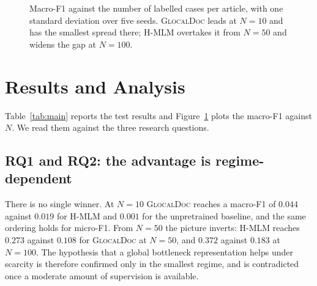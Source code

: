 \documentclass[conference]{IEEEtran}
\newcommand{\glocal}{\textsc{GlocalDoc}}
\newcommand{\hmlm}{\mbox{H-MLM}}
\begin{document}
\begin{figure}[t]
\centering
{}
\caption{Macro-F1 against the number of labelled cases per article, with one
standard deviation over five seeds. \glocal{} leads at $N=10$ and has the smallest
spread there; \hmlm{} overtakes it from $N=50$ and widens the gap at $N=100$.}
\label{fig:macro}
\end{figure}

\section{Results and Analysis}
\label{sec:results}
Table~\ref{tab:main} reports the test results and Figure~\ref{fig:macro} plots the
macro-F1 against $N$. We read them against the three research questions.

\subsection{RQ1 and RQ2: the advantage is regime-dependent}
There is no single winner. At $N=10$ \glocal{} reaches a macro-F1 of $0.044$ against
$0.019$ for \hmlm{} and $0.001$ for the unpretrained baseline, and the same ordering
holds for micro-F1. From $N=50$ the picture inverts: \hmlm{} reaches $0.273$ against
$0.108$ for \glocal{} at $N=50$, and $0.372$ against $0.183$ at $N=100$. The
hypothesis that a global bottleneck representation helps under scarcity is therefore
confirmed only in the smallest regime, and is contradicted once a moderate amount of
supervision is available.
\end{document}
